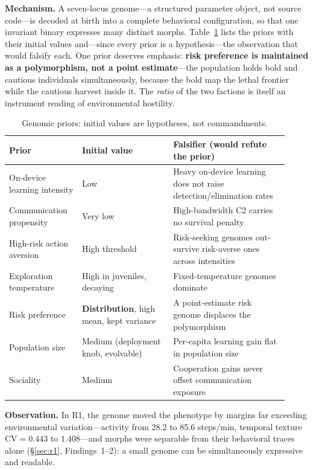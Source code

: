 \documentclass[11pt,a4paper]{article}
\begin{document}
\noindent\textbf{Mechanism.} A seven-locus genome---a structured parameter object, not source code---is decoded at birth into a complete behavioral configuration, so that one invariant binary expresses many distinct morphs. Table~\ref{tab:priors} lists the priors with their initial values and---since every prior is a hypothesis---the observation that would falsify each. One prior deserves emphasis: \textbf{risk preference is maintained as a polymorphism, not a point estimate}---the population holds bold and cautious individuals simultaneously, because the bold map the lethal frontier while the cautious harvest inside it. The \emph{ratio} of the two factions is itself an instrument reading of environmental hostility.

\begin{table}[t]
\centering\small
\caption{Genomic priors: initial values are hypotheses, not commandments.}
\label{tab:priors}
\begin{tabular}{@{}p{0.24\linewidth}p{0.30\linewidth}p{0.38\linewidth}@{}}
\toprule
\textbf{Prior} & \textbf{Initial value} & \textbf{Falsifier (would refute the prior)}\\
\midrule
On-device learning intensity & Low & Heavy on-device learning does not raise detection/elimination rates\\
Communication propensity & Very low & High-bandwidth C2 carries no survival penalty\\
High-risk action aversion & High threshold & Risk-seeking genomes out-survive risk-averse ones across intensities\\
Exploration temperature & High in juveniles, decaying & Fixed-temperature genomes dominate\\
Risk preference & \textbf{Distribution}, high mean, kept variance & A point-estimate risk genome displaces the polymorphism\\
Population size & Medium (deployment knob, evolvable) & Per-capita learning gain flat in population size\\
Sociality & Medium & Cooperation gains never offset communication exposure\\
\bottomrule
\end{tabular}
\end{table}

\noindent\textbf{Observation.} In R1, the genome moved the phenotype by margins far exceeding environmental variation---activity from 28.2 to 85.6 steps/min, temporal texture $\mathrm{CV} = 0.443$ to $1.408$---and morphs were separable from their behavioral traces alone (\S\ref{sec:r1}, Findings~1--2): a small genome can be simultaneously expressive and readable.
\end{document}
